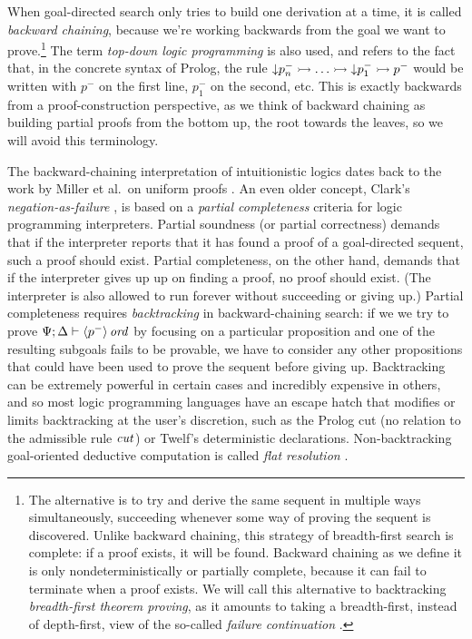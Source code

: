 When goal-directed search only tries to build one derivation at a
time, it is called {\it backward chaining}, because we're working
backwards from the goal we want to prove.\footnote{The alternative is
  to try and derive the same sequent in multiple ways simultaneously,
  succeeding whenever some way of proving the sequent is
  discovered. Unlike backward chaining, this strategy of breadth-first
  search is complete: if a proof exists, it will be found.  Backward
  chaining as we define it is only nondeterministically or 
  partially complete,
  because it can fail to terminate when a proof exists. We will call
  this alternative to backtracking {\it breadth-first theorem
    proving}, as it amounts to taking a breadth-first, instead of
  depth-first, view of the so-called {\it failure continuation}
  \cite{pfenning06backtracking}.} The term {\it top-down logic
  programming} is also used, and refers to the fact that, in the
concrete syntax of Prolog, the rule ${\downarrow}p_n^- \rightarrowtail \ldots
\rightarrowtail {\downarrow}p_1^- \rightarrowtail p^-$ would be written with $p^-$ on
the first line, $p_1^-$ on the second, etc. This is exactly backwards
from a proof-construction perspective, as we think of backward
chaining as building partial proofs from the bottom up, the
root towards the leaves, so we will
avoid this terminology.  

The backward-chaining interpretation of intuitionistic logics dates
back to the work by Miller et al.~on uniform proofs
\cite{miller91uniform}.  An even older concept, Clark's {\it
  negation-as-failure} \cite{clark87negation}, is based on a {\it
  partial completeness} criteria for logic programming interpreters.
Partial soundness (or partial correctness) demands that if the
interpreter reports that it has found a proof of a goal-directed
sequent, such a proof should exist. Partial completeness, on the other
hand, demands that if the interpreter gives up up on finding a proof,
no proof should exist. (The interpreter is also allowed to run forever
without succeeding or giving up.)  Partial completeness requires {\it
  backtracking} in backward-chaining search: if we we try to prove
${\Psi};{\Delta} \vdash {{\langle {p^-} \rangle}\,{{\it ord}}} \mathstrut$ by focusing on a particular
proposition and one of the resulting subgoals fails to be provable, we
have to consider any other propositions that could have been used to
prove the sequent before giving up. Backtracking can be extremely
powerful in certain cases and incredibly expensive in others, and so
most logic programming languages have an escape hatch that modifies or
limits backtracking at the user's discretion, such as the Prolog cut
(no relation to the admissible rule ${\it cut}$) or Twelf's
deterministic declarations. Non-backtracking goal-oriented deductive
computation is called {\it flat resolution} \cite{aitkaci99warrens}.

